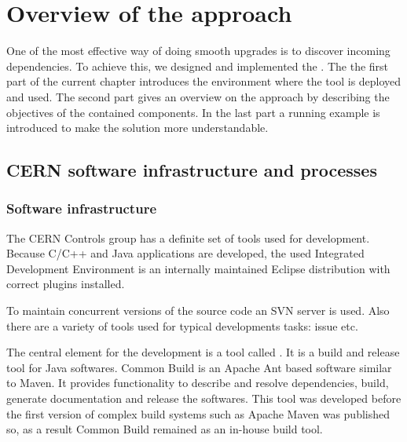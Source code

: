 %
\chapter{Overview of the approach}

One of the most effective  way of doing
smooth upgrades is to discover incoming dependencies. To achieve this, we
designed and implemented the \ptool{}. The the first part of the current chapter
introduces the environment where the tool is deployed and used. The second part
gives an overview on the \ptool{} approach by describing the objectives of the
contained components. In the last part a running example is introduced to make
the solution more understandable.


\section{CERN software infrastructure and processes}\label{sect:cerninf}

\subsection{Software infrastructure}

The CERN Controls group has a definite set of tools used for development. Because
C/C++ and Java applications are developed, the used Integrated Development
Environment is an internally maintained Eclipse distribution with correct
plugins installed.

To maintain concurrent versions of the source code an SVN server is used. Also
there are a variety of tools used for typical developments tasks: issue
etc. 

The central element for the development is a tool called 
\cite{CommonBuild}. It is a build and release tool for Java softwares. Common
Build is an Apache Ant based software similar to Maven. It provides
functionality to describe and resolve dependencies, build, generate
documentation and release the softwares. This tool was developed before the
first version of complex build systems such as Apache Maven was published so,
as a result 
Common Build remained as an in-house build tool. 

